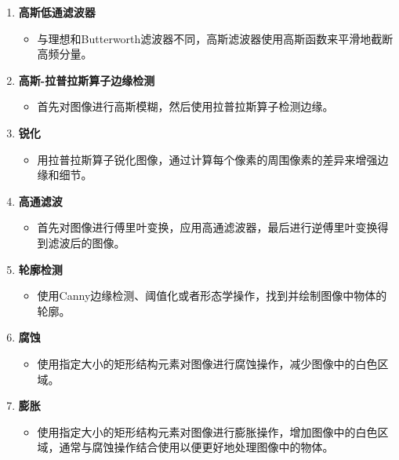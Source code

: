 \documentclass[UTF8,openany]{ctexbook}
\begin{document}
\begin{enumerate}[label=\arabic*., leftmargin=*]
  \item \textbf{高斯低通滤波器}
    \begin{itemize}[label=--, leftmargin=*]
      \item 与理想和Butterworth滤波器不同，高斯滤波器使用高斯函数来平滑地截断高频分量。
    \end{itemize}
  
  \item \textbf{高斯-拉普拉斯算子边缘检测}
    \begin{itemize}[label=--, leftmargin=*]
      \item 首先对图像进行高斯模糊，然后使用拉普拉斯算子检测边缘。
    \end{itemize}
  
  \item \textbf{锐化}
    \begin{itemize}[label=--, leftmargin=*]
      \item 用拉普拉斯算子锐化图像，通过计算每个像素的周围像素的差异来增强边缘和细节。
    \end{itemize}
  
  \item \textbf{高通滤波}
    \begin{itemize}[label=--, leftmargin=*]
      \item 首先对图像进行傅里叶变换，应用高通滤波器，最后进行逆傅里叶变换得到滤波后的图像。
    \end{itemize}

    \item \textbf{轮廓检测}
    \begin{itemize}[label=--, leftmargin=*]
    \item 使用Canny边缘检测、阈值化或者形态学操作，找到并绘制图像中物体的轮廓。
    \end{itemize}
  
  \item \textbf{腐蚀}
    \begin{itemize}[label=--, leftmargin=*]
      \item 使用指定大小的矩形结构元素对图像进行腐蚀操作，减少图像中的白色区域。
    \end{itemize}
  
  \item \textbf{膨胀}
    \begin{itemize}[label=--, leftmargin=*]
      \item 使用指定大小的矩形结构元素对图像进行膨胀操作，增加图像中的白色区域，通常与腐蚀操作结合使用以便更好地处理图像中的物体。
    \end{itemize}


\end{enumerate}
\end{document}
